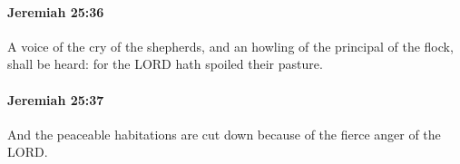 		\paragraph{Jeremiah 25:36} %
			\label{JEREMIAH-25-36}

			A voice of the cry of the shepherds, and an howling of the principal of the flock, shall be heard: for the LORD hath spoiled their pasture.


		\paragraph{Jeremiah 25:37} %
			\label{JEREMIAH-25-37}

			And the peaceable habitations are cut down because of the fierce anger of the LORD.


